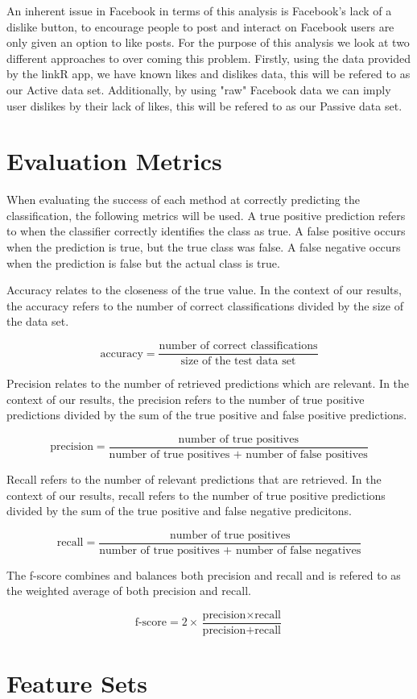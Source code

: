 An inherent issue in Facebook in terms of this analysis is Facebook's lack of a dislike button, to encourage people to post and interact on Facebook 
users are only given an option to like posts. For the purpose of this analysis we look at two different approaches to over coming this problem. Firstly, 
using the data provided by the linkR app, we have known likes and dislikes data, this will be refered to as our Active data set. Additionally, by using 
"raw" Facebook data we can imply user dislikes by their lack of likes, this will be refered to as our Passive data set.


\section{Evaluation Metrics}
\label{sec:notation}

When evaluating the success of each method at correctly predicting the classification, the following metrics will be used.
A true positive prediction refers to when the classifier correctly identifies the class as true. A false positive occurs when the prediction 
is true, but the true class was false. A false negative occurs when the prediction is false but the actual class is true.



Accuracy relates to the closeness of the true value. In the context of our results, the accuracy refers to the number of correct classifications 
divided by the size of the data set.

\[
 \text{accuracy} = \frac{\text{number of correct classifications}}{\text{size of the test data set}}
\]



Precision relates to the number of retrieved predictions which are relevant. In the context of our results, the precision refers to the number of true positive predictions 
divided by the sum of the true positive and false positive predictions.

\[
 \text{precision} = \frac{\text{number of true positives}}{\text{number of true positives + number of false positives}}
\]

Recall refers to the number of relevant predictions that are retrieved. In the context of our results, recall refers to the number of true positive predictions 
divided by the sum of the true positive and false negative predicitons.

\[
 \text{recall} = \frac{\text{number of true positives}}{\text{number of true positives + number of false negatives}}
\]


The f-score combines and balances both precision and recall and is refered to as the weighted average of both precision and recall. 

\[
 \text{f-score} = 2 \times \frac{\text{precision} \times \text{recall}}{\text{precision} + \text{recall}}
\]

\section{Feature Sets}
\label{sec:features}

